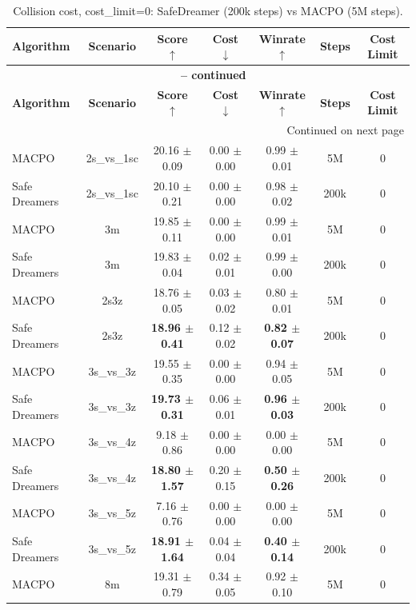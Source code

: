 \documentclass{article}
\begin{document}
\begin{longtable}{lcccccc}
\caption{Collision cost, cost\_limit=0: SafeDreamer (200k steps) vs MACPO (5M steps).}\\
\toprule
\textbf{Algorithm} & \textbf{Scenario} & \textbf{Score} $\uparrow$ & \textbf{Cost} $\downarrow$ & \textbf{Winrate} $\uparrow$ & \textbf{Steps} & \textbf{Cost Limit} \\
\midrule
\endfirsthead
\multicolumn{7}{c}{{\bfseries \tablename\ \thetable{} -- continued}} \\
\toprule
\textbf{Algorithm} & \textbf{Scenario} & \textbf{Score} $\uparrow$ & \textbf{Cost} $\downarrow$ & \textbf{Winrate} $\uparrow$ & \textbf{Steps} & \textbf{Cost Limit} \\
\midrule
\endhead
\midrule \multicolumn{7}{r}{{Continued on next page}} \\
\endfoot
\bottomrule
\endlastfoot
MACPO & 2s\_vs\_1sc & 20.16 $\pm$ 0.09 & 0.00 $\pm$ 0.00 & 0.99 $\pm$ 0.01 & 5M & 0 \\
Safe Dreamers & 2s\_vs\_1sc & 20.10 $\pm$ 0.21 & 0.00 $\pm$ 0.00 & 0.98 $\pm$ 0.02 & 200k & 0 \\
\midrule
MACPO & 3m & 19.85 $\pm$ 0.11 & 0.00 $\pm$ 0.00 & 0.99 $\pm$ 0.01 & 5M & 0 \\
Safe Dreamers & 3m & 19.83 $\pm$ 0.04 & 0.02 $\pm$ 0.01 & 0.99 $\pm$ 0.00 & 200k & 0 \\
\midrule
MACPO & 2s3z & 18.76 $\pm$ 0.05 & 0.03 $\pm$ 0.02 & 0.80 $\pm$ 0.01 & 5M & 0 \\
Safe Dreamers & 2s3z & \textbf{18.96 $\pm$ 0.41} & 0.12 $\pm$ 0.02 & \textbf{0.82 $\pm$ 0.07} & 200k & 0 \\
\midrule
MACPO & 3s\_vs\_3z & 19.55 $\pm$ 0.35 & 0.00 $\pm$ 0.00 & 0.94 $\pm$ 0.05 & 5M & 0 \\
Safe Dreamers & 3s\_vs\_3z & \textbf{19.73 $\pm$ 0.31} & 0.06 $\pm$ 0.01 & \textbf{0.96 $\pm$ 0.03} & 200k & 0 \\
\midrule
MACPO & 3s\_vs\_4z & 9.18 $\pm$ 0.86 & 0.00 $\pm$ 0.00 & 0.00 $\pm$ 0.00 & 5M & 0 \\
Safe Dreamers & 3s\_vs\_4z & \textbf{18.80 $\pm$ 1.57} & 0.20 $\pm$ 0.15 & \textbf{0.50 $\pm$ 0.26} & 200k & 0 \\
\midrule
MACPO & 3s\_vs\_5z & 7.16 $\pm$ 0.76 & 0.00 $\pm$ 0.00 & 0.00 $\pm$ 0.00 & 5M & 0 \\
Safe Dreamers & 3s\_vs\_5z & \textbf{18.91 $\pm$ 1.64} & 0.04 $\pm$ 0.04 & \textbf{0.40 $\pm$ 0.14} & 200k & 0 \\
\midrule
MACPO & 8m & 19.31 $\pm$ 0.79 & 0.34 $\pm$ 0.05 & 0.92 $\pm$ 0.10 & 5M & 0 \\

\end{longtable}
\end{document}
